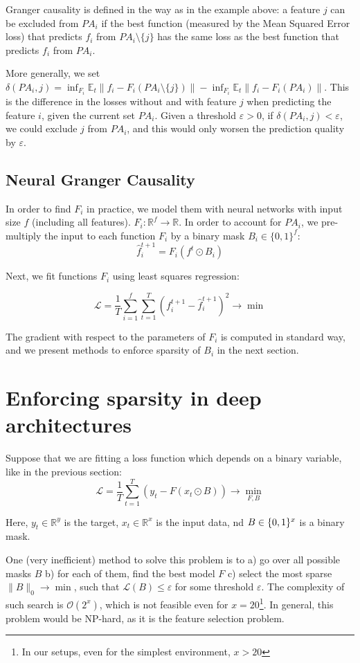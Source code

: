 \documentclass[a4paper,11pt,oneside]{report}
\begin{document}
Granger causality is defined in the way as in the example above: a feature $j$ can be excluded from $PA_i$ if the best function (measured by the Mean Squared Error loss) that predicts $f_i$ from $PA_i\setminus\{j\}$ has the same loss as the best function that predicts $f_i$ from $PA_i$.

More generally, we set $\delta(PA_i,j)=\inf_{F_i}\mathbb E_t\|f_i-F_i(PA_i\setminus\{j\})\|-\inf_{F_i}\mathbb E_t\|f_i-F_i(PA_i)\|$. This is the difference in the losses without and with feature $j$ when predicting the feature $i$, given the current set $PA_i$.
Given a threshold $\varepsilon>0$, if $\delta(PA_i,j)<\varepsilon$, we could exclude $j$ from $PA_i$, and this would only worsen the prediction quality by $\varepsilon$.

\subsection{Neural Granger Causality}
\label{subsec:neural_granger}
In order to find $F_i$ in practice, we model them with neural networks with input size $f$ (including all features). $F_i\colon \mathbb R^{f}\to\mathbb R$. In order to account for $PA_i$, we pre-multiply the input to each function $F_i$ by a binary mask $B_i\in\{0,1\}^f$:
$$
\hat{f}_i^{t+1}=F_i(f^t\odot B_i)
$$

Next, we fit functions $F_i$ using least squares regression:

$$
\mathcal L=\frac{1}{T}\sum\limits_{i=1}^f\sum\limits_{t=1}^T \left(f^{t+1}_i-\hat{f}_i^{t+1}\right)^2\to\min
$$

The gradient with respect to the parameters of $F_i$ is computed in standard way, and we present methods to enforce sparsity of $B_i$ in the next section.

\section{Enforcing sparsity in deep architectures}
\label{sec:sparse_deep}
Suppose that we are fitting a loss function which depends on a binary variable, like in the previous section:
$$
\mathcal L=\frac{1}{T}\sum\limits_{t=1}^T(y_t-F(x_t\odot B))\to\min\limits_{F,B}
$$

Here, $y_t\in\mathbb R^y$ is the target, $x_t\in\mathbb R^x$ is the input data, nd $B\in\mathbb \{0,1\}^x$ is a binary mask.

One (very inefficient) method to solve this problem is to a) go over all possible masks $B$ b) for each of them, find the best model $F$ c) select the most sparse $\|B\|_0\to\min$, such that $\mathcal L(B)\leq\varepsilon$ for some threshold $\varepsilon$. The complexity of such search is $\mathcal O(2^x)$, which is not feasible even for $x=20$\footnote{In our setups, even for the simplest environment, $x>20$}. In general, this problem would be NP-hard, as it is the feature selection problem.
\end{document}
